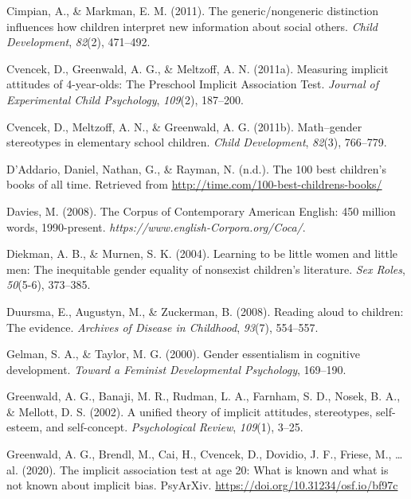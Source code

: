 \documentclass[
  english,
  ,man,floatsintext]{apa6}
\begin{document}
\leavevmode\hypertarget{ref-cimpian2011generic}{}%
Cimpian, A., \& Markman, E. M. (2011). The generic/nongeneric distinction influences how children interpret new information about social others. \emph{Child Development}, \emph{82}(2), 471--492.

\leavevmode\hypertarget{ref-cvencek2011measuring}{}%
Cvencek, D., Greenwald, A. G., \& Meltzoff, A. N. (2011a). Measuring implicit attitudes of 4-year-olds: The Preschool Implicit Association Test. \emph{Journal of Experimental Child Psychology}, \emph{109}(2), 187--200.

\leavevmode\hypertarget{ref-cvencek2011math}{}%
Cvencek, D., Meltzoff, A. N., \& Greenwald, A. G. (2011b). Math--gender stereotypes in elementary school children. \emph{Child Development}, \emph{82}(3), 766--779.

\leavevmode\hypertarget{ref-time_100_kidbooks}{}%
D'Addario, Daniel, Nathan, G., \& Rayman, N. (n.d.). The 100 best children's books of all time. Retrieved from \url{http://time.com/100-best-childrens-books/}

\leavevmode\hypertarget{ref-davies2008corpus}{}%
Davies, M. (2008). The Corpus of Contemporary American English: 450 million words, 1990-present. \emph{https://www.english-Corpora.org/Coca/}.

\leavevmode\hypertarget{ref-diekman2004learning}{}%
Diekman, A. B., \& Murnen, S. K. (2004). Learning to be little women and little men: The inequitable gender equality of nonsexist children's literature. \emph{Sex Roles}, \emph{50}(5-6), 373--385.

\leavevmode\hypertarget{ref-duursma2008reading}{}%
Duursma, E., Augustyn, M., \& Zuckerman, B. (2008). Reading aloud to children: The evidence. \emph{Archives of Disease in Childhood}, \emph{93}(7), 554--557.

\leavevmode\hypertarget{ref-gelman2000gender}{}%
Gelman, S. A., \& Taylor, M. G. (2000). Gender essentialism in cognitive development. \emph{Toward a Feminist Developmental Psychology}, 169--190.

\leavevmode\hypertarget{ref-greenwald2002unified}{}%
Greenwald, A. G., Banaji, M. R., Rudman, L. A., Farnham, S. D., Nosek, B. A., \& Mellott, D. S. (2002). A unified theory of implicit attitudes, stereotypes, self-esteem, and self-concept. \emph{Psychological Review}, \emph{109}(1), 3--25.

\leavevmode\hypertarget{ref-greenwald2020}{}%
Greenwald, A. G., Brendl, M., Cai, H., Cvencek, D., Dovidio, J. F., Friese, M., \ldots{} al. (2020). The implicit association test at age 20: What is known and what is not known about implicit bias. PsyArXiv. \url{https://doi.org/10.31234/osf.io/bf97c}
\end{document}
